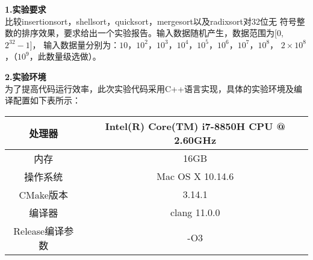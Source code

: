 \documentclass[a4paper]{article}
\begin{document}
\courseheader
{}

\info

\begin{enumerate}
  \setlength{\itemsep}{3\parskip}
  \textbf{1.实验要求}\\
  比较insertionsort，shellsort，quicksort，mergesort以及radixsort对32位无
  符号整数的排序效果，要求给出一个实验报告。输入数据随机产生，数据范围为[0,$2^{32}-1$]，
  输入数据量分别为：$10$，$10^2$，$10^3$，$10^4$，$10^5$，$10^6$，$10^7$，$10^8$，
  $2\times10^8$，（$10^9$，此数量级选做）。\\
  \bigskip

  \textbf{2.实验环境}\\
  为了提高代码运行效率，此次实验代码采用C++语言实现，具体的实验环境及编译配置如下表所示：\\ \medskip
  \begin{tabular}{c|c}
    \hline\hline
    处理器 & Intel(R) Core(TM) i7-8850H CPU @ 2.60GHz \\ \hline
    内存 & 16GB\\ \hline
    操作系统& Mac OS X 10.14.6\\ \hline
    CMake版本& 3.14.1\\ \hline
    编译器& clang 11.0.0\\ \hline
    Release编译参数& -O3\\
    \hline\hline
  \end{tabular}\\
  \bigskip


\end{enumerate}
\end{document}
